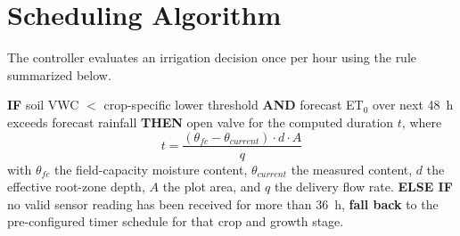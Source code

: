 \section{Scheduling Algorithm}
The controller evaluates an irrigation decision once per hour using the rule summarized
below.

\begin{tcolorbox}[keybox=Scheduling Rule (simplified)]
\textbf{IF} soil VWC $<$ crop-specific lower threshold \textbf{AND} forecast ET$_0$ over next
48~h exceeds forecast rainfall \textbf{THEN} open valve for the computed duration $t$, where
\[
t = \frac{(\theta_{fc} - \theta_{current}) \cdot d \cdot A}{q}
\]
with $\theta_{fc}$ the field-capacity moisture content, $\theta_{current}$ the measured
content, $d$ the effective root-zone depth, $A$ the plot area, and $q$ the delivery flow
rate. \textbf{ELSE IF} no valid sensor reading has been received for more than 36~h,
\textbf{fall back} to the pre-configured timer schedule for that crop and growth stage.
\end{tcolorbox}
